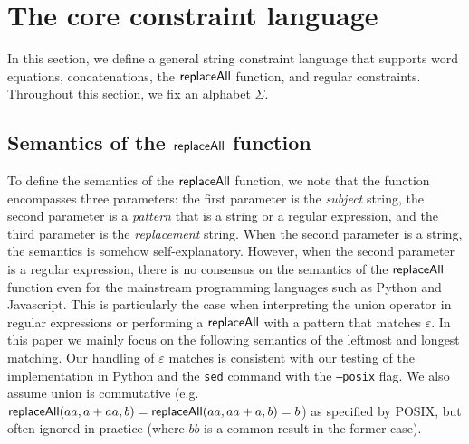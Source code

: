 
\section{The core constraint language}\label{sec-core}

In this section, we define a general string constraint language that supports word equations, concatenations, the $\mathsf{replaceAll}$ function, and regular constraints.  Throughout this section, we fix an alphabet $\Sigma$.



\subsection{Semantics of the $\mathsf{replaceAll}$ function}
To define the semantics of the $\mathsf{replaceAll}$ function, we note that the function encompasses three parameters: the first parameter is the \emph{subject} string, the second parameter is a \emph{pattern} that is a string or a regular expression, and the third parameter is the \emph{replacement} string. When the second parameter is a string, the semantics is somehow self-explanatory. However, when the second parameter is a regular expression, there is no consensus on the semantics of the $\mathsf{replaceAll}$ function even for the mainstream programming languages such as Python and Javascript.
 This is particularly the case when interpreting the union operator in regular expressions or performing a $\mathsf{replaceAll}$ with a pattern that matches $\varepsilon$. In this paper we mainly 
 focus on the following semantics of the leftmost and longest matching.
Our handling of $\varepsilon$ matches is consistent with our testing of the implementation in Python and the \texttt{sed} command with the \texttt{--posix} flag.
We also assume union is commutative (e.g.\ $\mathsf{replaceAll}(aa, a + aa, b) = \mathsf{replaceAll}(aa, aa + a, b) = b$) as specified by POSIX, but often ignored in practice (where $bb$ is a common result in the former case).


